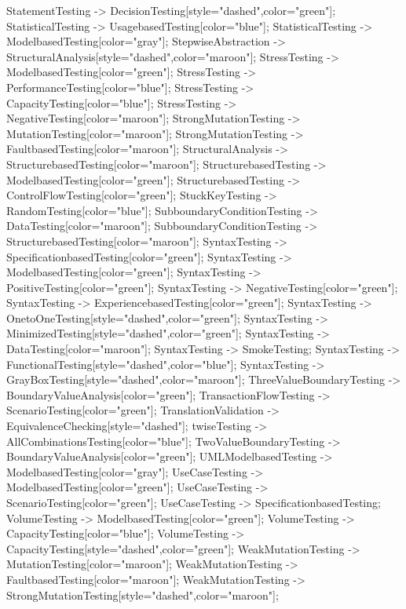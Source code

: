 \documentclass{article}
\begin{document}
{StatementTesting -> DecisionTesting[style="dashed",color="green"];
StatisticalTesting -> UsagebasedTesting[color="blue"];
StatisticalTesting -> ModelbasedTesting[color="gray"];
StepwiseAbstraction -> StructuralAnalysis[style="dashed",color="maroon"];
StressTesting -> ModelbasedTesting[color="green"];
StressTesting -> PerformanceTesting[color="blue"];
StressTesting -> CapacityTesting[color="blue"];
StressTesting -> NegativeTesting[color="maroon"];
StrongMutationTesting -> MutationTesting[color="maroon"];
StrongMutationTesting -> FaultbasedTesting[color="maroon"];
StructuralAnalysis -> StructurebasedTesting[color="maroon"];
StructurebasedTesting -> ModelbasedTesting[color="green"];
StructurebasedTesting -> ControlFlowTesting[color="green"];
StuckKeyTesting -> RandomTesting[color="blue"];
SubboundaryConditionTesting -> DataTesting[color="maroon"];
SubboundaryConditionTesting -> StructurebasedTesting[color="maroon"];
SyntaxTesting -> SpecificationbasedTesting[color="green"];
SyntaxTesting -> ModelbasedTesting[color="green"];
SyntaxTesting -> PositiveTesting[color="green"];
SyntaxTesting -> NegativeTesting[color="green"];
SyntaxTesting -> ExperiencebasedTesting[color="green"];
SyntaxTesting -> OnetoOneTesting[style="dashed",color="green"];
SyntaxTesting -> MinimizedTesting[style="dashed",color="green"];
SyntaxTesting -> DataTesting[color="maroon"];
SyntaxTesting -> SmokeTesting;
SyntaxTesting -> FunctionalTesting[style="dashed",color="blue"];
SyntaxTesting -> GrayBoxTesting[style="dashed",color="maroon"];
ThreeValueBoundaryTesting -> BoundaryValueAnalysis[color="green"];
TransactionFlowTesting -> ScenarioTesting[color="green"];
TranslationValidation -> EquivalenceChecking[style="dashed"];
twiseTesting -> AllCombinationsTesting[color="blue"];
TwoValueBoundaryTesting -> BoundaryValueAnalysis[color="green"];
UMLModelbasedTesting -> ModelbasedTesting[color="gray"];
UseCaseTesting -> ModelbasedTesting[color="green"];
UseCaseTesting -> ScenarioTesting[color="green"];
UseCaseTesting -> SpecificationbasedTesting;
VolumeTesting -> ModelbasedTesting[color="green"];
VolumeTesting -> CapacityTesting[color="blue"];
VolumeTesting -> CapacityTesting[style="dashed",color="green"];
WeakMutationTesting -> MutationTesting[color="maroon"];
WeakMutationTesting -> FaultbasedTesting[color="maroon"];
WeakMutationTesting -> StrongMutationTesting[style="dashed",color="maroon"];

}
\end{document}

